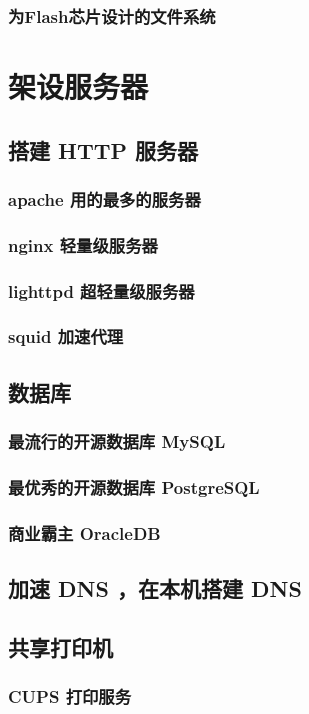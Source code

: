 \documentclass[amstex,twoside]{ctexbook}
\begin{document}
\subsection{  为Flash芯片设计的文件系统}

\chapter{架设服务器}
\section{  搭建 HTTP 服务器}
\subsection{  apache 用的最多的服务器}
\subsection{ nginx 轻量级服务器}
\subsection{ lighttpd 超轻量级服务器}
\subsection{ squid 加速代理	}
\section{  数据库	}
\subsection{  最流行的开源数据库 MySQL}
\subsection{  最优秀的开源数据库 PostgreSQL 	}
\subsection{  商业霸主 OracleDB	}
\section{  加速 DNS ，在本机搭建 DNS	}
\section{  共享打印机	}
\subsection{ CUPS 打印服务	}
\end{document}
